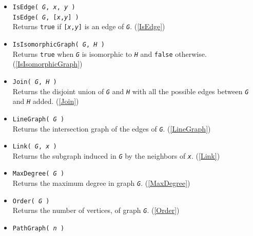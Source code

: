 \documentclass[a4paper,11pt]{report}
\begin{document}
{{\begin{itemize}
 Returns the graph \mbox{\texttt{\mdseries\slshape G}} where $V(G)=L$ and $XY\in E(G) \iff X\cap Y \neq \varnothing$. (\ref{IntersectionGraph}) 
\item \texttt{IsEdge( \mbox{\texttt{\mdseries\slshape G}}, \mbox{\texttt{\mdseries\slshape x}}, \mbox{\texttt{\mdseries\slshape y}} )}\\
 \texttt{IsEdge( \mbox{\texttt{\mdseries\slshape G}}, [\mbox{\texttt{\mdseries\slshape x}},\mbox{\texttt{\mdseries\slshape y}}] )}\\
 Returns \texttt{true} if \texttt{[\mbox{\texttt{\mdseries\slshape x}},\mbox{\texttt{\mdseries\slshape y}}]} is an edge of \mbox{\texttt{\mdseries\slshape G}}. (\ref{IsEdge}) 
\item \texttt{IsIsomorphicGraph( \mbox{\texttt{\mdseries\slshape G}}, \mbox{\texttt{\mdseries\slshape H}} )}\\
 Returns \texttt{true} when \mbox{\texttt{\mdseries\slshape G}} is isomorphic to \mbox{\texttt{\mdseries\slshape H}} and \texttt{false} otherwise. (\ref{IsIsomorphicGraph}) 
\item \texttt{Join( \mbox{\texttt{\mdseries\slshape G}}, \mbox{\texttt{\mdseries\slshape H}} )}\\
 Returns the disjoint union of \mbox{\texttt{\mdseries\slshape G}} and \mbox{\texttt{\mdseries\slshape H}} with all the possible edges between \mbox{\texttt{\mdseries\slshape G}} and \mbox{\texttt{\mdseries\slshape H}} added. (\ref{Join}) 
\item \texttt{LineGraph( \mbox{\texttt{\mdseries\slshape G}} )}\\
 Returns the intersection graph of the edges of \mbox{\texttt{\mdseries\slshape G}}. (\ref{LineGraph}) 
\item \texttt{Link( \mbox{\texttt{\mdseries\slshape G}}, \mbox{\texttt{\mdseries\slshape x}} )}\\
 Returns the subgraph induced in \mbox{\texttt{\mdseries\slshape G}} by the neighbors of \mbox{\texttt{\mdseries\slshape x}}. (\ref{Link}) 
\item \texttt{MaxDegree( \mbox{\texttt{\mdseries\slshape G}} )}\\
 Returns the maximum degree in graph \mbox{\texttt{\mdseries\slshape G}}. (\ref{MaxDegree}) 
\item \texttt{Order( \mbox{\texttt{\mdseries\slshape G}} )}\\
 Returns the number of vertices, of graph \mbox{\texttt{\mdseries\slshape G}}. (\ref{Order}) 
\item \texttt{PathGraph( \mbox{\texttt{\mdseries\slshape n}} )}\\

\end{itemize}}}
\end{document}

